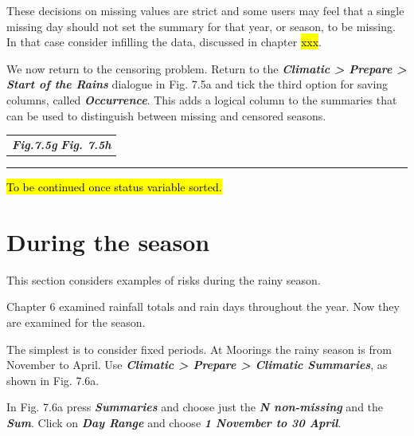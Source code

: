 \documentclass[
  letterpaper,
  DIV=11,
  numbers=noendperiod]{scrreprt}
\begin{document}
These decisions on missing values are strict and some users may feel
that a single missing day should not set the summary for that year, or
season, to be missing. In that case consider infilling the data,
discussed in chapter \hl{xxx}.

We now return to the censoring problem. Return to the
\textbf{\emph{Climatic \textgreater{} Prepare \textgreater{} Start of
the Rains}} dialogue in Fig. 7.5a and tick the third option for saving
columns, called \textbf{\emph{Occurrence}}. This adds a logical column
to the summaries that can be used to distinguish between missing and
censored seasons.

\begin{longtable}[]{@{}l@{}}
\toprule\noalign{}
\endhead
\bottomrule\noalign{}
\endlastfoot
\textbf{\emph{Fig.7.5g}} \textbf{\emph{Fig. 7.5h}} \\
\end{longtable}

\begin{center}\rule{0.5\linewidth}{0.5pt}\end{center}

\hl{To be continued once status variable sorted.}

\section{During the season}\label{during-the-season}

This section considers examples of risks during the rainy season.

Chapter 6 examined rainfall totals and rain days throughout the year.
Now they are examined for the season.

The simplest is to consider fixed periods. At Moorings the rainy season
is from November to April. Use \textbf{\emph{Climatic \textgreater{}
Prepare \textgreater{} Climatic Summaries}}, as shown in Fig. 7.6a.

In Fig. 7.6a press \textbf{\emph{Summaries}} and choose just the
\textbf{\emph{N non-missing}} and the \textbf{\emph{Sum}}. Click on
\textbf{\emph{Day Range}} and choose \textbf{\emph{1 November to 30
April}}.
\end{document}
